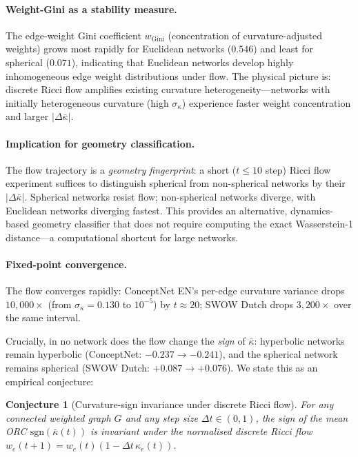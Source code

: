 \documentclass[11pt,a4paper]{article}
\newcommand{\kbar}{\bar{\kappa}}
\begin{document}
\paragraph{Weight-Gini as a stability measure.}
The edge-weight Gini coefficient $w_{\text{Gini}}$ (concentration of curvature-adjusted weights) grows most rapidly for Euclidean networks ($0.546$) and least for spherical ($0.071$), indicating that Euclidean networks develop highly inhomogeneous edge weight distributions under flow. The physical picture is: discrete Ricci flow amplifies existing curvature heterogeneity---networks with initially heterogeneous curvature (high $\sigma_\kappa$) experience faster weight concentration and larger $|\Delta\kbar|$.

\paragraph{Implication for geometry classification.}
The flow trajectory is a \emph{geometry fingerprint}: a short ($t \leq 10$ step) Ricci flow experiment suffices to distinguish spherical from non-spherical networks by their $|\Delta\kbar|$. Spherical networks resist flow; non-spherical networks diverge, with Euclidean networks diverging fastest. This provides an alternative, dynamics-based geometry classifier that does not require computing the exact Wasserstein-1 distance---a computational shortcut for large networks.
\paragraph{Fixed-point convergence.}
The flow converges rapidly: ConceptNet EN's per-edge curvature variance drops $10{,}000\times$ (from $\sigma_\kappa = 0.130$ to $10^{-5}$) by $t \approx 20$; SWOW Dutch drops $3{,}200\times$ over the same interval.

Crucially, in no network does the flow change the \emph{sign} of $\kbar$: hyperbolic networks remain hyperbolic (ConceptNet: $-0.237 \to -0.241$), and the spherical network remains spherical (SWOW Dutch: $+0.087 \to +0.076$). We state this as an empirical conjecture:

\medskip
\noindent\textbf{Conjecture 1} (Curvature-sign invariance under discrete Ricci flow).
\emph{For any connected weighted graph $G$ and any step size $\Delta t \in (0, 1)$, the sign of the mean ORC $\mathrm{sgn}(\bar\kappa(t))$ is invariant under the normalised discrete Ricci flow $w_e(t+1) = w_e(t)(1 - \Delta t\,\kappa_e(t))$.}
\medskip
\end{document}
